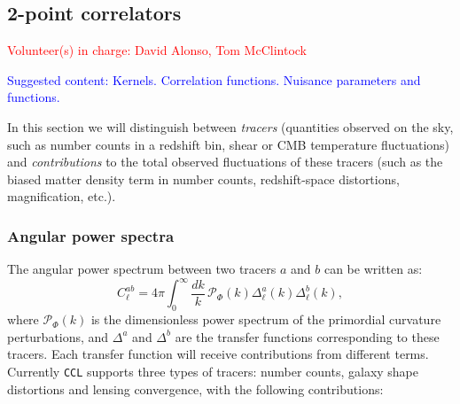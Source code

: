\documentclass[\docopts]{\docclass}
\newcommand{\vol}[1]{\textcolor{red}{Volunteer(s) in charge: #1}}
\newcommand{\cont}[1]{\textcolor{blue}{Suggested content: #1}}
\newcommand{\ccl}{{\tt CCL}\xspace}
\begin{document}
\subsection{2-point correlators}
\vol{David Alonso, Tom McClintock}

\cont{Kernels. Correlation functions. Nuisance parameters and functions.}

In this section we will distinguish between {\sl tracers} (quantities observed on the sky, such as number counts in a redshift bin, shear or CMB temperature fluctuations) and {\sl contributions} to the total observed fluctuations of these tracers (such as the biased matter density term in number counts, redshift-space distortions, magnification, etc.).

\subsubsection{Angular power spectra}\label{sssec:2pt.pspec}

The angular power spectrum between two tracers $a$ and $b$ can be written as:
\begin{equation}
  C^{ab}_\ell=4\pi\int_0^\infty \frac{dk}{k}\,\mathcal{P}_\Phi(k)\Delta^a_\ell(k)\Delta^b_\ell(k),
\end{equation}
where $\mathcal{P}_\Phi(k)$ is the dimensionless power spectrum of the primordial curvature perturbations, and $\Delta^a$ and $\Delta^b$ are the transfer functions corresponding to these tracers. Each transfer function will receive contributions from different terms. Currently \ccl supports three types of tracers: number counts, galaxy shape distortions and lensing convergence, with the following contributions:
\end{document}

